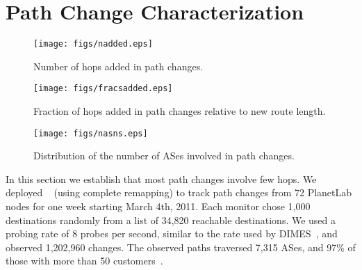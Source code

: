 \section{Path Change Characterization}
\label{sec:char}

\begin{figure*}[t]
\begin{minipage}{0.32\textwidth}
\texttt{[image: figs/nadded.eps]}
\caption{Number of hops added in path changes.}
\label{fig:char.nrouters}
\end{minipage}
\hfill
%
\begin{minipage}{0.32\textwidth}
\texttt{[image: figs/fracsadded.eps]}
\caption{Fraction of hops added in path changes relative to new route
length.}
\label{fig:char.fracs}
\end{minipage}
\hfill
%
\begin{minipage}{0.32\textwidth}
\texttt{[image: figs/nasns.eps]}
\caption{Distribution of the number of ASes involved in path changes.}
\label{fig:char.nasns}
\end{minipage}
%
\end{figure*}

%


In this section we establish that most path changes involve few hops.
We deployed \dtrack{}~\cite{cunha11dtrack} (using complete remapping) to
track path changes from 72 PlanetLab nodes for one week starting March
4th, 2011.  Each monitor chose 1,000 destinations randomly from a list
of 34,820 reachable destinations.  We used a probing rate of 8 probes per
second, similar to the rate used by DIMES~\cite{shavitt09dimes}, and
observed 1,202,960  changes.  The observed paths traversed 7,315 ASes,
and 97\% of those with more than 50
customers~\cite{luckie13asrel}.

